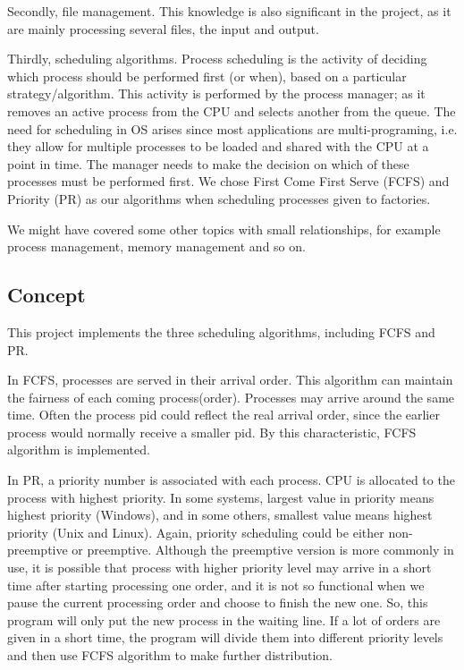 \documentclass{ieeeaccess}
\begin{document}
Secondly, file management. This knowledge is also significant in the project, as it are mainly processing several files, the input and output.

Thirdly, scheduling algorithms. Process scheduling is the activity of deciding which process should be performed first (or when), based on a particular strategy/algorithm. This activity is performed by the process manager; as it removes an active process from the CPU and selects another from the queue. The need for scheduling in OS arises since most applications are multi-programing, i.e. they allow for multiple processes to be loaded and shared with the CPU at a point in time. The manager needs to make the decision on which of these processes must be performed first. We chose First Come First Serve (FCFS) and Priority (PR) as our algorithms when scheduling processes given to factories.

We might have covered some other topics with small relationships, for example process management, memory management and so on.

\subsection{Concept}
This project implements the three scheduling algorithms, including FCFS and PR.

In FCFS, processes are served in their arrival order. This algorithm can maintain the fairness of each coming process(order). Processes may arrive around the same time. Often the process pid could reflect the real arrival order, since the earlier process would normally receive a smaller pid. By this characteristic, FCFS algorithm is implemented.

In PR, a priority number is associated with each process. CPU is allocated to the process with highest priority. In some systems, largest value in priority means highest priority (Windows), and in some others, smallest value means highest priority (Unix and Linux). Again, priority scheduling could be either non-preemptive or preemptive. Although the preemptive version is more commonly in use, it is possible that process with higher priority level may arrive in a short time after starting processing one order, and it is not so functional when we pause the current processing order and choose to finish the new one. So, this program will only put the new process in the waiting line. If a lot of orders are given in a short time, the program will divide them into different priority levels and then use FCFS algorithm to make further distribution.
\end{document}
